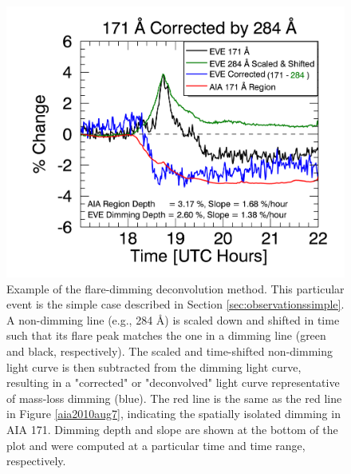 \begin{figure}[!h]
    \begin{center}
	    \includegraphics[width=166mm]{Images/DimmingCorrectionProcedure.png}
    \end{center}
    \caption[Flare-dimming deconvolution method]{
        Example of the flare-dimming deconvolution method. This particular event is the simple case described in 
        Section \ref{sec:observationssimple}. A non-dimming line (e.g., 284 \AA) is scaled down and shifted in 
        time such that its flare peak matches the one in a dimming line (green and black, respectively). The scaled and 
        time-shifted non-dimming light curve is then subtracted from the dimming light curve, resulting in a "corrected" or
        "deconvolved" light curve representative of mass-loss dimming (blue). The red line is the same as the red line in 
        Figure \ref{aia2010aug7}, indicating the spatially isolated dimming in AIA 171. Dimming depth and slope are shown
        at the bottom of the plot and were computed at a particular time and time range, respectively. 
	}
    \label{flaredimmingdeconvolution}
\end{figure}


